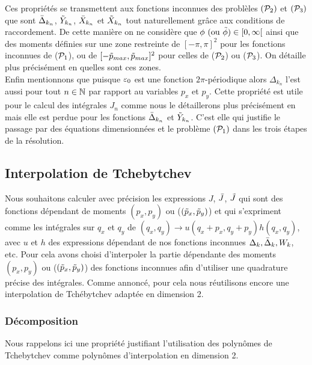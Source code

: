 \documentclass[10.5pt]{article}
\begin{document}
\begin{multicols}{2}
Ces propriétés se transmettent aux fonctions inconnues des problèles $(\mathcal{P}_2)$ et $(\mathcal{P}_3)$ que sont $\bar{\Delta}_{k_n}$, $\tilde{Y}_{k_n}$, $\bar{X}_{k_n}$ et $\tilde{X}_{k_n}$ tout naturellement grâce aux conditions de raccordement.
De cette manière on ne considère que $\phi \text{ (ou } \tilde{\phi}) \in [0, \infty[$ ainsi que des moments définies sur une zone restreinte de $[-\pi, \pi]^2$ pour les fonctions inconnues de ($\mathcal{P}_1$), ou de $[-\tilde{p}_{max}, \tilde{p}_{max}]^2$ pour celles de ($\mathcal{P}_2$) ou ($\mathcal{P}_3$). On détaille plus précisément en  quelles sont ces zones. \\
\indent
 Enfin mentionnons que puisque $\varepsilon_0$ est une fonction $2\pi$-périodique alors $\Delta_{k_n}$ l'est aussi pour tout $n\in\mathbb{N}$ par rapport au variables $p_x$ et $p_y$. Cette propriété est utile pour le calcul des intégrales $J_n$ comme nous le détaillerons plus précisément en  mais elle est perdue pour les fonctions $\bar{\Delta}_{k_n}$ et $\tilde{Y}_{k_n}$. C'est elle qui justifie le passage par des équations dimensionnées et le problème $(\mathcal{P}_1)$ dans les trois étapes de la résolution.





\subsection{Interpolation de Tchebytchev}

Nous souhaitons calculer avec précision les expressions $J$, $\bar{J}$, $\tilde{J}$ qui sont des fonctions dépendant de moments $(p_x, p_y)$ ou ($(\tilde{p}_x, \tilde{p}_y)$) et qui s'expriment comme les intégrales sur $q_x$ et $q_y$ de $(q_x, q_y) \to u(q_x + p_{x}, q_y + p_{y})h(q_x, q_y)$, avec $u$ et $h$ des expressions dépendant de nos fonctions inconnues $\Delta_k, \bar{\Delta}_k, W_k$, etc. Pour cela avons choisi d'interpoler la partie dépendante des moments $(p_x, p_y)$ ou ($(\tilde{p}_x, \tilde{p}_y)$) des fonctions inconnues afin d'utiliser une quadrature précise des intégrales. Comme annoncé, pour cela nous réutilisons encore une interpolation de Tchébytchev adaptée en dimension 2. 

\subsubsection{Décomposition}

Nous rappelons ici une propriété justifiant l'utilisation des polynômes de Tchebytchev comme polynômes d'interpolation en dimension 2.\\


\end{multicols}
\end{document}
